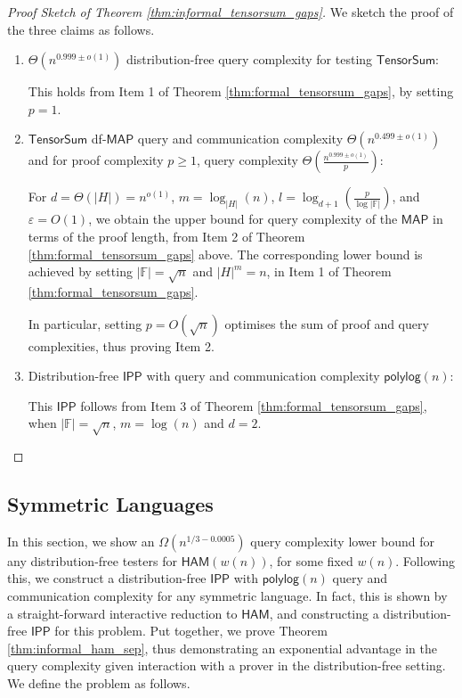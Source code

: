 \documentclass[10pt,a4paper]{article}
\newcommand{\polylog}{\mathsf{polylog}}
\newcommand{\HAM}{\mathsf{HAM}}
\newcommand{\IPP}{\mathsf{IPP}}
\newcommand{\MAP}{\mathsf{MAP}}
\newcommand{\TensorSum}{\mathsf{TensorSum}}
\begin{document}
\begin{proof}[Proof Sketch of Theorem \ref{thm:informal_tensorsum_gaps}]
We sketch the proof of the three claims as follows.
\begin{enumerate}
    \item $\Theta(n^{0.999\pm o(1)})$ distribution-free query complexity for testing $\TensorSum$:
    
    This holds from Item 1 of Theorem \ref{thm:formal_tensorsum_gaps}, by setting $p = 1$.
    
    \item $\TensorSum$ df-$\MAP$ query and communication complexity $\Theta(n^{0.499\pm o(1)})$ and for proof complexity $p\geq 1$, query complexity $\Theta(\frac{n^{0.999\pm o(1)}}{p})$:
    
    For $d=\Theta(\vert H \vert)=n^{o(1)}$, $m=\log_{|H|}(n)$, $l=\log_{d+1}(\frac{p}{\log |\mathbb{F}|})$, and $\varepsilon=O(1)$, we obtain the upper bound for query complexity of the $\MAP$ in terms of the proof length, from Item 2 of Theorem \ref{thm:formal_tensorsum_gaps} above. The corresponding lower bound is achieved by setting $|\mathbb{F}|=\sqrt{n}$ and $|H|^{m}=n$, in Item 1 of Theorem \ref{thm:formal_tensorsum_gaps}. 

    In particular, setting $p = O(\sqrt{n})$ optimises the sum of proof and query complexities, thus proving Item 2.
    
    \item Distribution-free $\IPP$ with query and communication complexity $\polylog(n)$:
    
    This $\IPP$ follows from Item 3 of Theorem \ref{thm:formal_tensorsum_gaps}, when $|\mathbb{F}|=\sqrt{n}$, $m=\log(n)$ and $d=2$.
\end{enumerate}    
\end{proof}

\subsection{Symmetric Languages}
\label{sec:sym}



In this section, we show an $\Omega(n^{1/3-0.0005})$ query complexity lower bound for any distribution-free testers for $\HAM(w(n))$, for some fixed $w(n)$. Following this, we construct a distribution-free $\IPP$ with $\polylog(n)$ query and communication complexity for any symmetric language. In fact, this is shown by a straight-forward interactive reduction to $\HAM$, and constructing a distribution-free $\IPP$ for this problem. Put together, we prove Theorem \ref{thm:informal_ham_sep}, thus demonstrating an exponential advantage in the query complexity given interaction with a prover in the distribution-free setting. We define the problem as follows.
\end{document}
